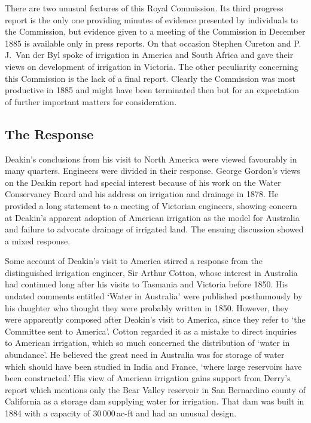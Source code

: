There are two unusual features of this Royal Commission.  Its third
progress report is the only one providing minutes of evidence
presented by individuals to the Commission, but evidence given to a
meeting of the Commission in December 1885 is available only in press
reports.  On that occasion Stephen Cureton and P.\,J.~Van der Byl
spoke of irrigation in America and South Africa and gave their views
on development of irrigation in Victoria.  The other peculiarity
concerning this Commission is the lack of a final report.  Clearly the
Commission was most productive in 1885 and might have been terminated
then but for an expectation of further important matters for
consideration.

\subsection*{The Response}

Deakin's conclusions from his visit to North America were viewed
favourably in many quarters.  Engineers were divided in their
response.  George Gordon's views on the Deakin report had special
interest because of his work on the Water Conservancy Board and his
address on irrigation and drainage in 1878.  He provided a long
statement to a meeting of Victorian engineers, showing concern at
Deakin's apparent adoption of American irrigation as the model for
Australia and failure to advocate drainage of irrigated land.  The
ensuing discussion showed a mixed response.

Some account of Deakin's visit to America stirred a response from the
distinguished irrigation engineer, Sir Arthur Cotton, whose interest
in Australia had continued long after his visits to Tasmania and
Victoria before 1850.  His undated comments entitled `Water in
Australia' were published posthumously by his daughter who thought
they were probably written in 1850.  However, they were apparently
composed after Deakin's visit to America, since they refer to `the
Committee sent to America'.  Cotton regarded it as a mistake to direct
inquiries to American irrigation, which so much concerned the
distribution of `water in abundance'.  He believed the great need in
Australia was for storage of water which should have been studied in
India and France, `where large reservoirs have been constructed.'  His
view of American irrigation gains support from Derry's report which
mentions only the Bear Valley reservoir in San Bernardino county of
California as a storage dam supplying water for irrigation.  That dam
was built in 1884 with a capacity of 30\,000\,ac-ft and had an unusual
design.

